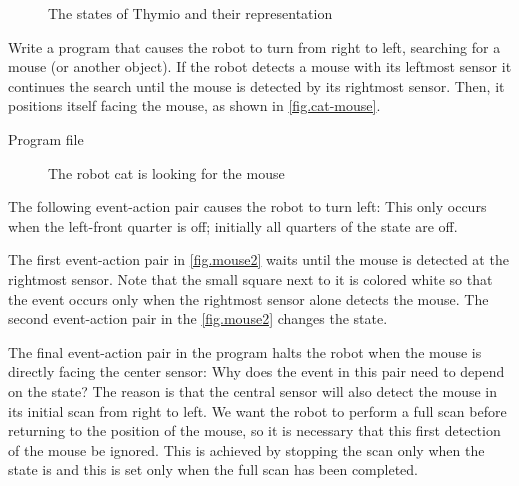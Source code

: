 \begin{figure}
	\hfill
	\caption{The states of Thymio and their representation}
\end{figure}


Write a program that causes the robot to turn from right to left,
searching for a mouse (or another object).
If the robot detects a mouse with its leftmost sensor it
continues the search until the mouse is detected by its rightmost
sensor. Then, it positions itself facing the mouse, as shown in \cref{fig.cat-mouse}.

{\raggedleft \hfill Program file }

\begin{figure}
	\hfill
	\caption{The robot cat is looking for the mouse}
\end{figure}

The following event-action pair causes the robot to turn left: 
This only occurs when the left-front quarter is off; initially all
quarters of the state are off.

The first event-action pair in \cref{fig.mouse2} waits until the
mouse is detected at the rightmost sensor. Note that the small square
next to it is colored white so that the event occurs only when the
rightmost sensor alone detects the mouse. The second event-action pair
in the \cref{fig.mouse2} changes the state.

The final event-action pair in the program halts the robot when the mouse is directly facing the center
sensor: 
Why does the event in this pair need to depend on the state? The reason
is that the central sensor will also detect the mouse in its initial
scan from right to left. We want the robot to perform a full scan
before returning to the position of the mouse, so it is necessary that
this first detection of the mouse be ignored. This is achieved by
stopping the scan only when the state is  and this is set only
when the full scan has been completed.

